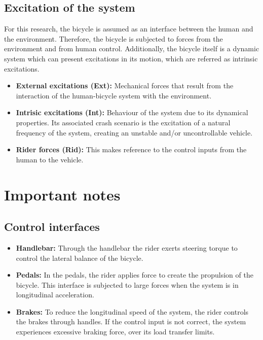 \documentclass{article}
\begin{document}
\subsection{Excitation of the system}

For this research, the bicycle is assumed as an interface between the human and the environment.
%
Therefore, the bicycle is subjected to forces from the environment and from human control.
%
Additionally, the bicycle itself is a dynamic system which can present excitations in its motion, which are referred as intrinsic excitations.


\begin{itemize}
    \item \textbf{External excitations (Ext):} Mechanical forces that result from the interaction of the human-bicycle system with the environment.
    \item \textbf{Intrisic excitations (Int):} Behaviour of the system due to its dynamical properties.
        Its associated crash scenario is the excitation of a natural frequency of the system, creating an unstable and/or uncontrollable vehicle.
    \item \textbf{Rider forces (Rid):} This makes reference to the control inputs from the human to the vehicle.
\end{itemize}


\section{Important notes}


\subsection{Control interfaces}

\begin{itemize}
    \item \textbf{Handlebar:} Through the handlebar the rider exerts steering torque to control the lateral balance of the bicycle.
    \item \textbf{Pedals:} In the pedals, the rider applies force to create the propulsion of the bicycle.
        This interface is subjected to large forces when the system is in longitudinal acceleration.
    \item \textbf{Brakes:} To reduce the longitudinal speed of the system, the rider controls the brakes through handles.
        If the control input is not correct, the system experiences excessive braking force, over its load transfer limits.
\end{itemize}
\end{document}
